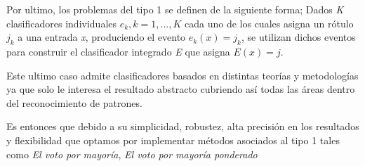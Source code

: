Por ultimo, los problemas del tipo 1 se definen de la siguiente forma; Dados \textit{K} clasificadores individuales $ e_{k}, k = 1,...,K $ cada uno de los cuales asigna un rótulo $ j_{k} $ a una entrada \textit{x}, produciendo el evento $ e_{k}(x) = j_{k} $, se utilizan dichos eventos para construir el clasificador integrado \textit{E} que asigna $ E(x) = j $. 

Este ultimo caso admite clasificadores basados en distintas teorías y metodologías ya que solo le interesa el resultado abstracto cubriendo así todas las áreas dentro del reconocimiento de patrones. 

Es entonces que debido a su simplicidad, robustez, alta precisión en los resultados y flexibilidad que optamos por implementar métodos asociados al tipo 1 tales como \textit{El voto por mayoría}, \textit{El voto por mayoría ponderado}
